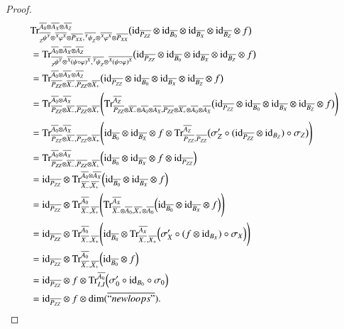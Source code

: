 \documentclass{amsart}
\def\tn{\textnormal}
\def\dim{\tn{dim}}
\def\Trace{\tn{Tr}}
\def\ol{\overline}
\def\id{\tn{id}}
\newcommand{\inp}[1]{{#1_-}}
\newcommand{\outp}[1]{{#1_+}}
\newcommand{\feeddd}[3]{{\tensor*[^{#2}_{\color{white}{!}}]{{#1}}{^{#3}}}}%
\newcommand{\feeddc}[3]{{\tensor*[^{#2}]{{#1}}{_{#3}}}}
\newcommand{\feedcd}[3]{{\tensor*[_{#2}]{{#1}}{^{#3}}}}
\theoremstyle{remark}
\theoremstyle{definition}
\begin{document}
\begin{proof}
\begin{align*}
&\Trace^{\ol{A_0}\otimes\ol{A_X}\otimes\ol{A_Z}}_{\ol{\feedcd{\psi}{Z}{Y}}\otimes\ol{\feeddd{\varphi}{X}{X}}\otimes\ol{P_{XX}},\ol{\feeddc{\psi}{Y}{Z}}\otimes\ol{\feeddd{\varphi}{X}{X}}\otimes\ol{P_{XX}}}
\big(\id_{\ol{P_{ZZ}}}\otimes\id_{\ol{B_0}}\otimes\id_{\ol{B_X}}\otimes\id_{\ol{B_Z}}\otimes f\big)\\
&=\Trace^{\ol{A_0}\otimes\ol{A_X}\otimes\ol{A_Z}}_{\ol{\feedcd{\psi}{Z}{Y}}\otimes\ol{\feeddd{(\psi\circ\varphi)}{X}{X}},\ol{\feeddc{\psi}{Y}{Z}}\otimes\ol{\feeddd{(\psi\circ\varphi)}{X}{X}}}
\big(\id_{\ol{P_{ZZ}}}\otimes\id_{\ol{B_0}}\otimes\id_{\ol{B_X}}\otimes\id_{\ol{B_Z}}\otimes f\big)\\
&=\Trace^{\ol{A_0}\otimes\ol{A_X}\otimes\ol{A_Z}}_{\ol{P_{ZZ}}\otimes\ol{\inp{X}},\ol{P_{ZZ}}\otimes\ol{\outp{X}}}
\big(\id_{\ol{P_{ZZ}}}\otimes\id_{\ol{B_0}}\otimes\id_{\ol{B_X}}\otimes\id_{\ol{B_Z}}\otimes f\big)\\
&=\Trace^{\ol{A_0}\otimes\ol{A_X}}_{\ol{P_{ZZ}}\otimes\ol{\inp{X}},\ol{P_{ZZ}}\otimes\ol{\outp{X}}}\Bigg(
\Trace^{\ol{A_Z}}_{\ol{P_{ZZ}}\otimes\ol{\inp{X}}\otimes\ol{A_0}\otimes\ol{A_X},\ol{P_{ZZ}}\otimes\ol{\outp{X}}\otimes\ol{A_0}\otimes\ol{A_X}}\big(\id_{\ol{P_{ZZ}}}\otimes\id_{\ol{B_0}}\otimes\id_{\ol{B_X}}\otimes\id_{\ol{B_Z}}\otimes f\big)\Bigg)\\
&=\Trace^{\ol{A_0}\otimes\ol{A_X}}_{\ol{P_{ZZ}}\otimes\ol{\inp{X}},\ol{P_{ZZ}}\otimes\ol{\outp{X}}}\Bigg(
\id_{\ol{B_0}}\otimes\id_{\ol{B_X}}\otimes f\otimes\Trace^{\ol{A_Z}}_{\ol{P_{ZZ}},\ol{P_{ZZ}}}\big(\sigma_Z'\circ(\id_{\ol{P_{ZZ}}}\otimes\id_{B_Z})\circ\sigma_Z\big)\Bigg)\\
&=\Trace^{\ol{A_0}\otimes\ol{A_X}}_{\ol{P_{ZZ}}\otimes\ol{\inp{X}},\ol{P_{ZZ}}\otimes\ol{\outp{X}}}\Big(\id_{\ol{B_0}}\otimes\id_{\ol{B_X}}\otimes f\otimes\id_{\ol{P_{ZZ}}}\Big)\\
&=\id_{\ol{P_{ZZ}}}\otimes\Trace^{\ol{A_0}\otimes\ol{A_X}}_{\ol{\inp{X}},\ol{\outp{X}}}\Big(
\id_{\ol{B_0}}\otimes\id_{\ol{B_X}}\otimes f\Big)\\
&=\id_{\ol{P_{ZZ}}}\otimes\Trace^{\ol{A_0}}_{\ol{\inp{X}},\ol{\outp{X}}}\Bigg(
\Trace^{\ol{A_X}}_{\ol{\inp{X}}\otimes\ol{A_0},\ol{\outp{X}}\otimes\ol{A_0}}\Big(\id_{\ol{B_0}}\otimes\id_{\ol{B_X}}\otimes f\Big)\Bigg)\\
&=\id_{\ol{P_{ZZ}}}\otimes\Trace^{\ol{A_0}}_{\ol{\inp{X}},\ol{\outp{X}}}\Bigg(
\id_{\ol{B_0}}\otimes\Trace^{\ol{A_X}}_{\ol{\inp{X}},\ol{\outp{X}}}\Big(\sigma_X'\circ(f\otimes\id_{B_X})\circ\sigma_X\Big)\Bigg)\\
&=\id_{\ol{P_{ZZ}}}\otimes\Trace^{\ol{A_0}}_{\ol{\inp{X}},\ol{\outp{X}}}\Big(
\id_{\ol{B_0}}\otimes f\Big)\\
&=\id_{\ol{P_{ZZ}}}\otimes f\otimes\Trace^{\ol{A_0}}_{I,I}\Big(
\sigma_0'\circ\id_{B_0}\circ\sigma_0\Big)\\
&=\id_{\ol{P_{ZZ}}}\otimes f\otimes\dim(\ol{``newloops"}).
\end{align*}


\end{proof}
\end{document}

